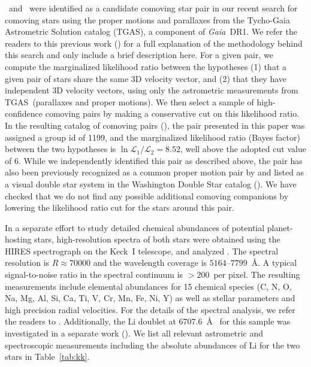 \documentclass[modern, letterpaper]{aastex61}
\newcommand{\project}[1]{\textsl{#1}}
\newcommand{\acronym}[1]{{\small{#1}}}
\newcommand{\gaia}{\project{Gaia}}
\newcommand{\figname}{Figure}
\newcommand{\dr}{\acronym{DR1}}
\newcommand{\tgas}{\acronym{TGAS}}
\newcommand*\elem[1]{\ensuremath{\mathrm{#1}}}
\newcommand{\sunanalog}{\text{Krios}}
\newcommand{\bizarreone}{\text{Kronos}}
\begin{document}
\sunanalog\ and \bizarreone\ were identified as a candidate comoving star pair
in our recent search for comoving stars using the proper motions and parallaxes
from the Tycho-Gaia Astrometric Solution catalog (\tgas), a component of \gaia\
\dr.
We refer the readers to this previous work (\citealt{2017AJ....153..257O}) for a
full explanation of the methodology behind this search and only include
a brief description here.
For a given pair, we compute the marginalized likelihood ratio between the
hypotheses (1) that a given pair of stars share the same 3D velocity vector,
and (2) that they have independent 3D velocity vectors, using only the
astrometric measurements from \tgas\ (parallaxes and proper motions).
We then select a sample of high-confidence comoving pairs by making a
conservative cut on this likelihood ratio.
In the resulting catalog of comoving pairs (\citealt{2017AJ....153..257O}),
the pair presented in this paper was assigned a group id of 1199,
and the marginalized likelihood ratio (Bayes factor)
between the two hypotheses is $\ln{\mathcal{L}_1/\mathcal{L}_2} = 8.52$,
well above the adopted cut value of 6.
While we independently identified this pair as described above,
the pair has also been previously recognized as a common proper motion pair
by \citealt{1986A&AS...66..131H} and listed as 
a visual double star system
in the Washington Double Star catalog (\citealt{2001AJ....122.3466M}).
We have checked that we do not find any possible additional comoving companions
by lowering the likelihood ratio cut for the stars around this pair.

In a separate effort to study detailed chemical abundances of potential
planet-hosting stars, high-resolution spectra of both stars were obtained using
the HIRES spectrograph on the Keck~I telescope, and analyzed
\citep{2016ApJS..225...32B}.
The spectral resolution is $R\approx 70000$ and the wavelength coverage is
$5164$--$7799$~\AA.
A typical signal-to-noise ratio in the spectral continuum is $>200$~per pixel.
The resulting measurements include elemental abundances for 15 chemical species
(C, N, O, Na, Mg, Al, Si, Ca, Ti, V, Cr, Mn, Fe, Ni, Y) as well as stellar parameters
and high precision radial velocities.
For the details of the spectral analysis, we refer the readers to
\citealt{2016ApJS..225...32B}.
Additionally, the \elem{Li} doublet at $6707.6$~\AA\
for this sample was investigated in a separate work (\citealt{jmlithium}).
We list all relevant astrometric and spectroscopic measurements including the
absolute abundances of \elem{Li} for the two stars in Table~\ref{tab:kk}.
\end{document}
